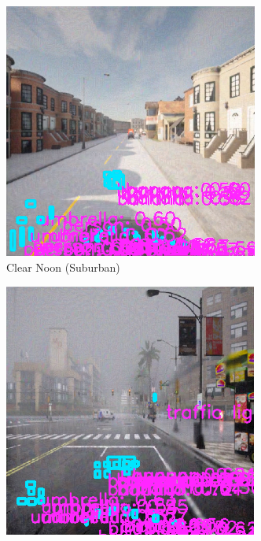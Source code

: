 \begin{figure}[H]
\begin{subfigure}[b]{0.48\textwidth}
        \includegraphics[width=\textwidth]{figures/chapter_detection/hardware/clear_noon_urban.png}
        \caption{Clear Noon (Suburban)}
        \label{fig:clear_noon_suburban}
    \end{subfigure}
    \begin{subfigure}[b]{0.48\textwidth}
        \centering
        \includegraphics[width=\textwidth]{figures/chapter_detection/hardware/hard_rain_city.png}

\end{subfigure}
\end{figure}

